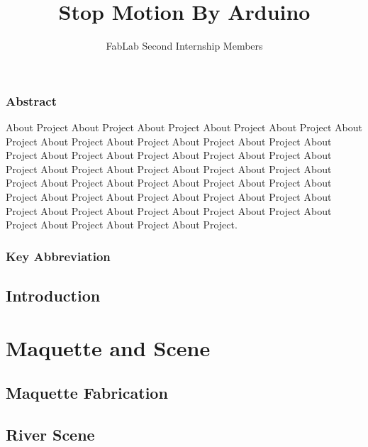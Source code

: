 \documentclass[]{report}
\title{Stop Motion By Arduino}
\author{FabLab Second Internship Members}
\begin{document}
\maketitle

\section*{Abstract}
	About Project About Project About Project About Project About Project About Project About Project About Project About Project About Project About Project About Project About Project About Project About Project About Project About Project About Project About Project About Project About Project About Project About Project About Project About Project About Project About Project About Project About Project About Project About Project About Project About Project About Project About Project About Project About Project About Project About Project.


\newpage

\section*{Key Abbreviation}


\tableofcontents

\listoffigures
{}

\listoftables
{}

\newpage

\chapter{Introduction}

\part{Maquette and Scene}

	\chapter{Maquette Fabrication}
	
	\chapter{River Scene}
	
\end{document}
